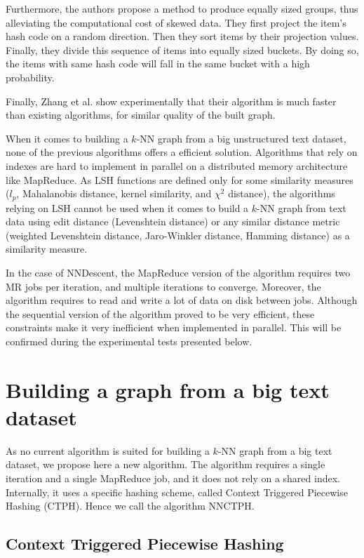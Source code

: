 \documentclass[wcp]{jmlr}
\begin{document}
Furthermore, the authors propose a method to produce equally sized groups, thus alleviating the computational cost of skewed data. They first project the item's hash code on a random direction. Then they sort items by their projection values. Finally, they divide this sequence of items into equally sized buckets. By doing so, the items with same hash code will fall in the same bucket with a high probability.

Finally, Zhang et al. show experimentally that their algorithm is much faster than existing algorithms, for similar quality of the built graph.

When it comes to building a $k$-NN graph from a big unstructured text dataset, none of the previous algorithms offers a efficient solution. Algorithms that rely on indexes are hard to implement in parallel on a distributed memory architecture like MapReduce. As LSH functions are defined only for some similarity measures ($l_p$, Mahalanobis distance, kernel similarity, and $\chi^2$ distance), the algorithms relying on LSH cannot be used when it comes to build a $k$-NN graph from text data using edit distance (Levenshtein distance) or any similar distance metric (weighted Levenshtein distance, Jaro-Winkler distance, Hamming distance) as a similarity measure.

In the case of NNDescent, the MapReduce version of the algorithm requires two MR jobs per iteration, and multiple iterations to converge. Moreover, the algorithm requires to read and write a lot of data on disk between jobs. Although the sequential version of the algorithm proved to be very efficient, these constraints make it very inefficient when implemented in parallel. This will be confirmed during the experimental tests presented below.

\section{Building a graph from a big text dataset}

As no current algorithm is suited for building a $k$-NN graph from a big text dataset, we propose here a new algorithm. The algorithm requires a single iteration and a single MapReduce job, and it does not rely on a shared index. Internally, it uses a specific hashing scheme, called Context Triggered Piecewise Hashing (CTPH). Hence we call the algorithm NNCTPH.

\subsection{Context Triggered Piecewise Hashing}
\end{document}
